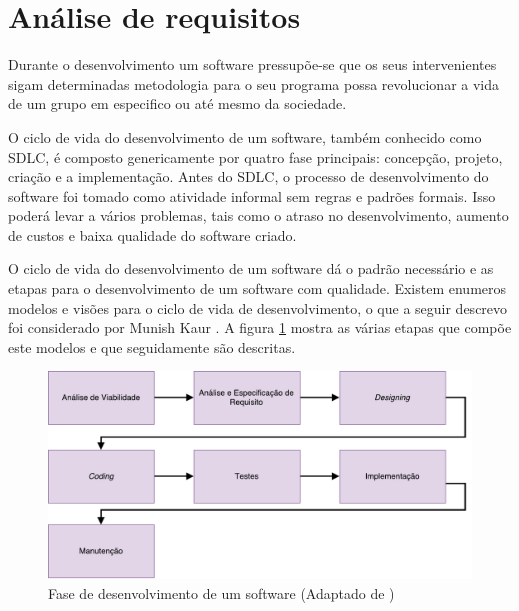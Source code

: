 \section{Análise de requisitos}

Durante o desenvolvimento um software pressupõe-se que os seus intervenientes sigam determinadas metodologia para o seu programa possa revolucionar a vida de um grupo em especifico ou até mesmo da sociedade. 


O ciclo de vida do desenvolvimento de um software, também conhecido como \ac{SDLC}, é composto genericamente por quatro fase principais: concepção, projeto, criação e a implementação. Antes do \ac{SDLC}, o processo de desenvolvimento do software foi tomado como atividade informal sem regras e padrões formais. Isso poderá levar a vários problemas, tais como o atraso no desenvolvimento, aumento de custos e baixa qualidade do software criado. 

O ciclo de vida do desenvolvimento de um software dá o padrão necessário e as etapas para o desenvolvimento de um software com qualidade. Existem enumeros modelos e visões para o ciclo de vida de desenvolvimento, o que a seguir descrevo foi considerado por Munish Kaur \cite{Saini2014}. A figura \ref{sdlcartic} mostra as várias etapas que compõe este modelos e que seguidamente são descritas. 


\begin{figure}[!htb]
	\centering
	\includegraphics[scale=0.6]{esquemas/desenvolvimentoSW.pdf}
	\caption[Fase de desenvolvimento de um software ]{Fase de desenvolvimento de um software (Adaptado de \cite{Saini2014})}
	\label{sdlcartic}
\end{figure}




